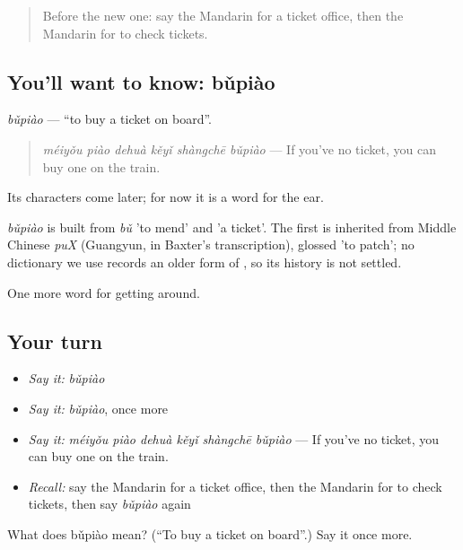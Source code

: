 \label{lesson:ZH-C404-bupiao}



\begin{quote}
Before the new one: say the Mandarin for a ticket office, then the Mandarin for to check tickets.
\end{quote}

\subsection*{You'll want to know: bǔpiào}
\emph{bǔpiào} — \textquotedblleft{}to buy a ticket on board\textquotedblright{}.

\begin{quote}
\emph{méiyǒu piào dehuà kěyǐ shàngchē bǔpiào} — If you've no ticket, you can buy one on the train.
\end{quote}

Its characters come later; for now it is a word for the ear.

\begin{cousinweb}
\emph{bǔpiào} is built from \emph{bǔ} 'to mend' and  'a ticket'. The first is inherited from Middle Chinese \emph{puX} (Guangyun, in Baxter's transcription), glossed 'to patch'; no dictionary we use records an older form of , so its history is not settled.
\end{cousinweb}

\begin{grammarlens}[title={What you've built}]
One more word for getting around.
\end{grammarlens}

\subsection*{Your turn}
\begin{itemize}
\raggedright
  \item \emph{Say it:} \emph{bǔpiào}
  \item \emph{Say it:} \emph{bǔpiào}, once more
  \item \emph{Say it:} \emph{méiyǒu piào dehuà kěyǐ shàngchē bǔpiào} — If you've no ticket, you can buy one on the train.
  \item \emph{Recall:} say the Mandarin for a ticket office, then the Mandarin for to check tickets, then say \emph{bǔpiào} again
\end{itemize}

\begin{tcolorbox}[breakable,colback=teal!4,colframe=teal!35!black,title={Before you move on}]
What does bǔpiào mean? (\textquotedblleft{}To buy a ticket on board\textquotedblright{}.) Say it once more.
\end{tcolorbox}
